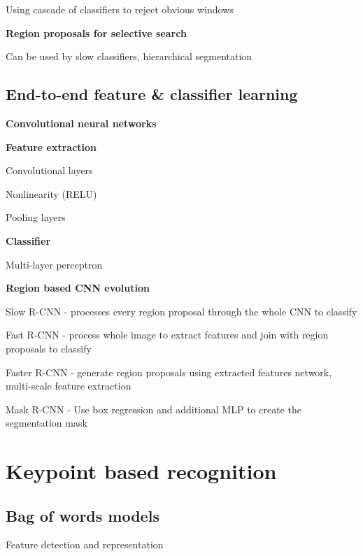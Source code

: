 \documentclass{article}
\begin{document}
\begin{multicols*}{2}
{\begin{compactitem}
	\item Using cascade of classifiers to reject obvious windows
\end{compactitem}

\textbf{Region proposals for selective search}

Can be used by slow classifiers, hierarchical segmentation

\subsection{End-to-end feature \& classifier learning}

\textbf{Convolutional neural networks}

\begin{compactitem}
	\item[] \textbf{Feature extraction}
	\item Convolutional layers
	\item Nonlinearity (RELU)
	\item Pooling layers
	\item[] \textbf{Classifier}
	\item Multi-layer perceptron
\end{compactitem}

\textbf{Region based CNN evolution}
\begin{compactitem}
	\item Slow R-CNN - processes every region proposal through the whole CNN to classify
	\item Fast R-CNN - process whole image to extract features and join with region proposals to classify
	\item Faster R-CNN - generate region proposals using extracted features network, multi-scale feature extraction	
	\item Mask R-CNN - Use box regression and additional MLP to create the segmentation mask
\end{compactitem}


\section{Keypoint based recognition}

\subsection{Bag of words models}

\begin{compactenum}
	\item Feature detection and representation
	

\end{compactenum}}
\end{multicols*}
\end{document}
